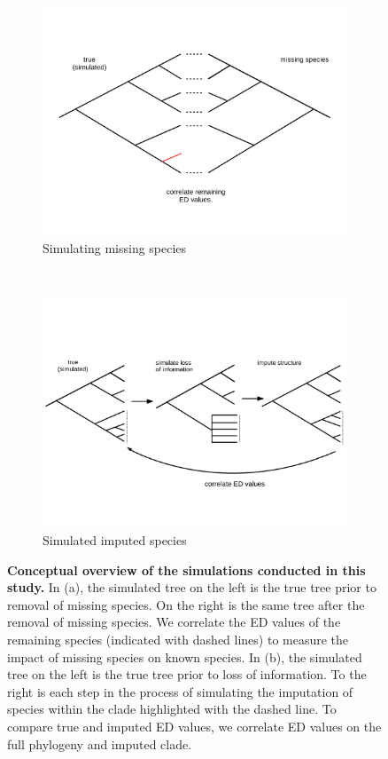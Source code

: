 \documentclass[12pt,english]{article}
\begin{document}
\begin{figure}[!ht]
  \center
  \begin{subfigure}{0.9\textwidth}
    \includegraphics[width=.75\textwidth]{missingSpecies.png}      
    \caption{Simulating missing species}
  \end{subfigure}
  \\
  \begin{subfigure}{0.9\textwidth}
    \includegraphics[width=.75\textwidth]{imputeConcept.png}      
    \caption{Simulated imputed species}
  \end{subfigure}
  \caption{\textbf{Conceptual overview of the simulations conducted in
      this study.} In (a), the simulated tree on the left is the true
    tree prior to removal of missing species. On the right is the same
    tree after the removal of missing species. We correlate the ED
    values of the remaining species (indicated with dashed lines) to
    measure the impact of missing species on known species. In (b),
    the simulated tree on the left is the true tree prior to loss of
    information. To the right is each step in the process of
    simulating the imputation of species within the clade highlighted
    with the dashed line. To compare true and imputed ED values, we
    correlate ED values on the full phylogeny and imputed clade.}
  \label{conceptual}
\end{figure}
\end{document}
